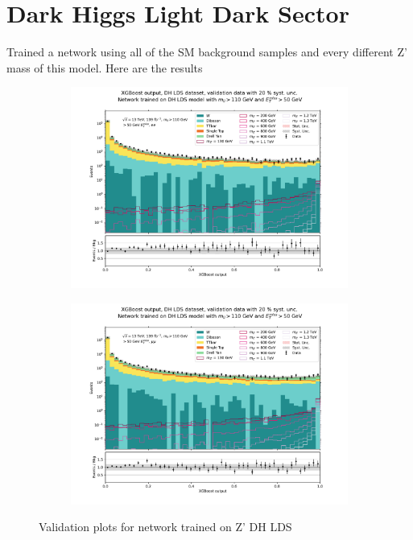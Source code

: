 \documentclass[14pt, a4paper]{book}
\begin{document}
\newpage
\section{Dark Higgs Light Dark Sector}
Trained a network using all of the SM background samples and every different Z' mass of this model. Here are the results
\begin{figure}[!ht]
	\centering
	\begin{subfigure}[b]{0.49\textwidth}
      \centering
      \includegraphics[width=1\textwidth]{XGBoost/DH_LDS/VAL_ee.pdf}
      \end{subfigure}
   \hfill
   \begin{subfigure}[b]{0.49\textwidth}
      \centering
      \includegraphics[width=1\textwidth]{XGBoost/DH_LDS/VAL_uu.pdf}
      \end{subfigure}
   \caption{Validation plots for network trained on Z' DH LDS}\label{fig:DH_LDS_vals}
\end{figure}
\end{document}
